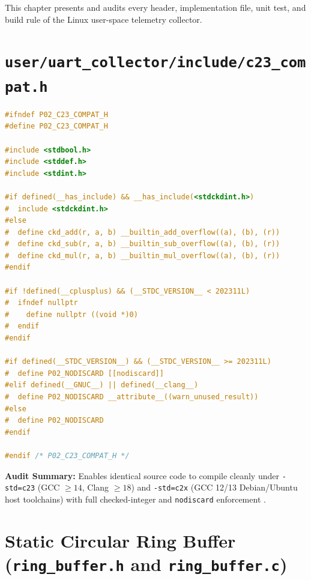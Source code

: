 \documentclass[11pt,a4paper,oneside]{report}
\begin{document}
This chapter presents and audits every header, implementation file, unit test, and build rule of the Linux user-space telemetry collector.

\section{\texttt{user/uart\_collector/include/c23\_compat.h}}

\begin{lstlisting}[language=C,caption={Complete listing of \texttt{user/uart\_collector/include/c23\_compat.h}.}]
#ifndef P02_C23_COMPAT_H
#define P02_C23_COMPAT_H

#include <stdbool.h>
#include <stddef.h>
#include <stdint.h>

#if defined(__has_include) && __has_include(<stdckdint.h>)
#  include <stdckdint.h>
#else
#  define ckd_add(r, a, b) __builtin_add_overflow((a), (b), (r))
#  define ckd_sub(r, a, b) __builtin_sub_overflow((a), (b), (r))
#  define ckd_mul(r, a, b) __builtin_mul_overflow((a), (b), (r))
#endif

#if !defined(__cplusplus) && (__STDC_VERSION__ < 202311L)
#  ifndef nullptr
#    define nullptr ((void *)0)
#  endif
#endif

#if defined(__STDC_VERSION__) && (__STDC_VERSION__ >= 202311L)
#  define P02_NODISCARD [[nodiscard]]
#elif defined(__GNUC__) || defined(__clang__)
#  define P02_NODISCARD __attribute__((warn_unused_result))
#else
#  define P02_NODISCARD
#endif

#endif /* P02_C23_COMPAT_H */
\end{lstlisting}

\textbf{Audit Summary:} Enables identical source code to compile cleanly under \texttt{-std=c23} (GCC $\ge 14$, Clang $\ge 18$) and \texttt{-std=c2x} (GCC 12/13 Debian/Ubuntu host toolchains) with full checked-integer and \texttt{nodiscard} enforcement \cite{gcc_dialect}.

\section{Static Circular Ring Buffer (\texttt{ring\_buffer.h} and \texttt{ring\_buffer.c})}
\end{document}
